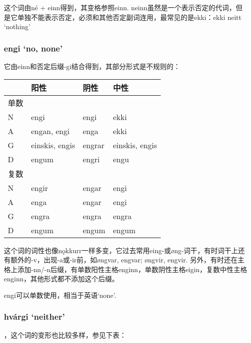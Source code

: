 \begin{introduction}[章节要点]
这个词由né + einn得到，其变格参照einn. neinn虽然是一个表示否定的代词，但是它单独不能表示否定，必须和其他否定副词连用，最常见的是ekki：ekki neitt `nothing'

\subsubsection{engi `no, none‌'}

它由einn和否定后缀-gi结合得到，其部分形式是不规则的：

\begin{longtable}{llll}
    \toprule
         & 阳性           & 阴性   & 中性           \\
    \midrule
    \endhead
    \bottomrule
    \endfoot
    单数 &                &        &                \\
    N    & engi           & engi   & ekki           \\
    A    & engan, engi    & enga   & ekki           \\
    G    & einskis, engis & engrar & einskis, engis \\
    D    & engum          & engri  & engu           \\
    复数 &                &        &                \\
    N    & engir          & engar  & engi           \\
    A    & enga           & engar  & engi           \\
    G    & engra          & engra  & engra          \\
    D    & engum          & engum  & engum          \\
\end{longtable}

这个词的词性也像nǫkkurr一样多变，它过去常用eing-或øng-词干，有时词干上还有额外的-v，出现-a或-ir前，如øngvar, engvar; øngvir, engvir. 另外，有时还在主格上添加-nn/-n后缀，有单数阳性主格enginn，单数阴性主格eigin，复数中性主格enginn，其他形式都不添加这个后缀。

engi可以单数使用，相当于英语`none'.

\subsubsection{hvárgi `neither'}，这个词的变形也比较多样，参见下表：


\end{introduction}
